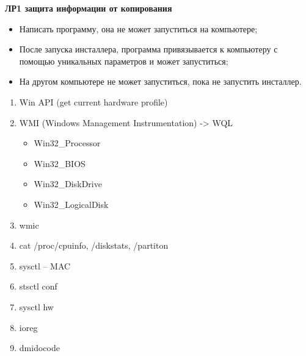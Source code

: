 \begin{lbox}{\textbf{ЛР1 защита информации от копирования}}
    \begin{itemize}
        \item Написать программу, она не может запуститься на компьютере;
        \item После запуска инсталлера, программа привязывается к компьютеру с помощью уникальных параметров и может запуститься;
        \item На другом компьютере не может запуститься, пока не запустить инсталлер.
    \end{itemize}

    \begin{enumerate}
        \item Win API (get current hardware profile)
        \item WMI (Windows Management Instrumentation) -> WQL

            \begin{itemize}
                \item Win32\_Processor
                \item Win32\_BIOS
                \item Win32\_DiskDrive
                \item Win32\_LogicalDisk
            \end{itemize}

        \item wmic
        \item cat /proc/cpuinfo, /diskstats, /partiton
        \item sysctl -- MAC
        \item stsctl conf
        \item sysctl hw
        \item ioreg
        \item dmidocode
    \end{enumerate}
\end{lbox}
